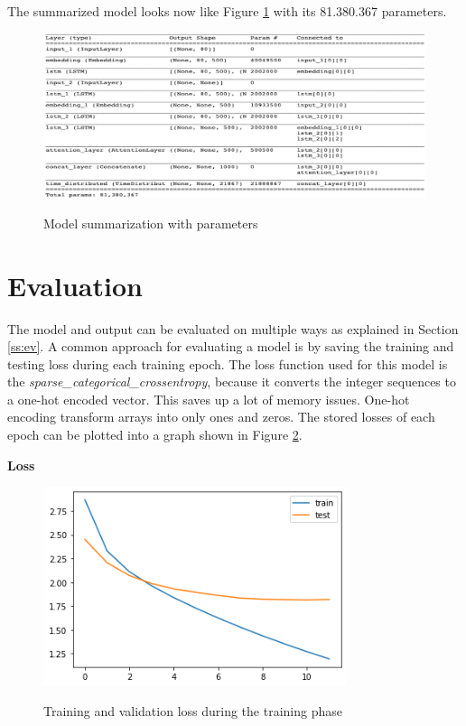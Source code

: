 The summarized model looks now like Figure \ref{model_sum} with its 81.380.367 parameters.

\begin{figure}
	\begin{center}
		\includegraphics[width=6in]{photos/model_sum}\\
		\caption{Model summarization with parameters}\label{model_sum}
	\end{center}
\end{figure}

\section{Evaluation}\label{ss:eval}

The model and output can be evaluated on multiple ways as explained in Section \ref{ss:ev}. A common approach for evaluating a model is by saving the training and testing loss during each training epoch. The loss function used for this model is the \textit{sparse\_categorical\_crossentropy}, because it converts the integer sequences to a one-hot encoded vector. This saves up a lot of memory issues. One-hot encoding transform arrays into only ones and zeros. The stored losses of each epoch can be plotted into a graph shown in Figure \ref{eval}.

\textbf{Loss}

\begin{figure}
	\begin{center}
		\includegraphics[width=3.5in]{photos/eval}\\
		\caption{Training and validation loss during the training phase}\label{eval}
	\end{center}
\end{figure}


